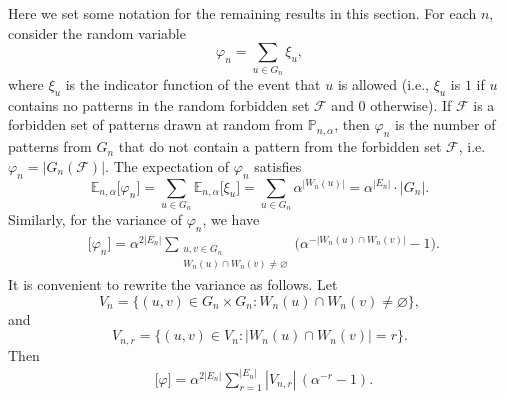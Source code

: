 \documentclass[12pt]{amsart}
\theoremstyle{definition}
\DeclareMathOperator{\Var}{Var_{n,\alpha}}
\def\EE{\mathbb{E}_{n,\alpha}}
\begin{document}
Here we set some notation for the remaining results in this section.
For each $n$, consider the random variable
\begin{equation*}
\varphi_n = \sum_{u \in G_n} \xi_u,
\end{equation*} 
where $\xi_u$ is the indicator function of the event that $u$ is allowed (i.e., $\xi_u$ is $1$ if $u$ contains no patterns in the random forbidden set $\mathcal{F}$ and $0$ otherwise). If $\mathcal{F}$ is a forbidden set of patterns drawn at random from $\mathbb{P}_{n,\alpha}$, then $\varphi_n$ is the number of patterns from $G_n$ that do not contain a pattern from the forbidden set $\mathcal{F}$, i.e. $\varphi_n = |G_n(\mathcal{F})|$. The expectation of $\varphi_n$ satisfies
\begin{equation} \label{Eqn:Expectation}
\EE \bigl[ \varphi_n \bigr] = \sum_{u \in G_n} \EE \bigl[ \xi_u \big] = \sum_{u \in G_n} \alpha^{|W_n(u)|} = \alpha^{|E_n|} \cdot |G_n|.
\end{equation}
Similarly, for the variance of $\varphi_n$, we have
\begin{align*}
\Var \bigl[ \varphi_n \bigr]  = \alpha^{2|E_n|} \sum_{\substack{u,v \in G_n \\ W_n(u) \cap W_n(v) \neq \varnothing }} \bigl(\alpha^{-| W_n(u) \cap W_n(v) |} - 1 \bigr).
\end{align*}
It is convenient to rewrite the variance as follows.
Let 
\begin{equation*}
V_n  = \bigl\{ (u,v) \in G_n \times G_n : W_n(u) \cap W_n(v) \neq \varnothing \bigr\},
\end{equation*}
and
\begin{equation*}
V_{n,r} = \bigl\{ (u,v) \in V_n : |W_n(u) \cap W_n(v)| = r \bigr\}.
\end{equation*}
Then
\begin{align} \label{Eqn:Variance}
\Var \bigl[ \varphi \bigr]  = \alpha^{2|E_n|}  \sum_{r=1}^{|E_n|} |V_{n,r}| \, (\alpha^{-r}-1).
\end{align}
\end{document}
